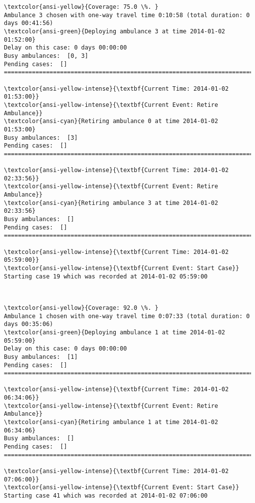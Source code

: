 \documentclass[11pt]{article}
\begin{document}
    \begin{Verbatim}[commandchars=\\\{\}]
\textcolor{ansi-yellow}{Coverage: 75.0 \%. }
Ambulance 3 chosen with one-way travel time 0:10:58 (total duration: 0 days 00:41:56)
\textcolor{ansi-green}{Deploying ambulance 3 at time 2014-01-02 01:52:00}
Delay on this case: 0 days 00:00:00
Busy ambulances:  [0, 3]
Pending cases:  []
========================================================================

\textcolor{ansi-yellow-intense}{\textbf{Current Time: 2014-01-02 01:53:00}}
\textcolor{ansi-yellow-intense}{\textbf{Current Event: Retire Ambulance}}
\textcolor{ansi-cyan}{Retiring ambulance 0 at time 2014-01-02 01:53:00}
Busy ambulances:  [3]
Pending cases:  []
========================================================================

\textcolor{ansi-yellow-intense}{\textbf{Current Time: 2014-01-02 02:33:56}}
\textcolor{ansi-yellow-intense}{\textbf{Current Event: Retire Ambulance}}
\textcolor{ansi-cyan}{Retiring ambulance 3 at time 2014-01-02 02:33:56}
Busy ambulances:  []
Pending cases:  []
========================================================================

\textcolor{ansi-yellow-intense}{\textbf{Current Time: 2014-01-02 05:59:00}}
\textcolor{ansi-yellow-intense}{\textbf{Current Event: Start Case}}
Starting case 19 which was recorded at 2014-01-02 05:59:00

    \end{Verbatim}

    \begin{center}
    \end{center}
    { \hspace*{\fill} \\}
    
    \begin{Verbatim}[commandchars=\\\{\}]
\textcolor{ansi-yellow}{Coverage: 92.0 \%. }
Ambulance 1 chosen with one-way travel time 0:07:33 (total duration: 0 days 00:35:06)
\textcolor{ansi-green}{Deploying ambulance 1 at time 2014-01-02 05:59:00}
Delay on this case: 0 days 00:00:00
Busy ambulances:  [1]
Pending cases:  []
========================================================================

\textcolor{ansi-yellow-intense}{\textbf{Current Time: 2014-01-02 06:34:06}}
\textcolor{ansi-yellow-intense}{\textbf{Current Event: Retire Ambulance}}
\textcolor{ansi-cyan}{Retiring ambulance 1 at time 2014-01-02 06:34:06}
Busy ambulances:  []
Pending cases:  []
========================================================================

\textcolor{ansi-yellow-intense}{\textbf{Current Time: 2014-01-02 07:06:00}}
\textcolor{ansi-yellow-intense}{\textbf{Current Event: Start Case}}
Starting case 41 which was recorded at 2014-01-02 07:06:00

    \end{Verbatim}
\end{document}
